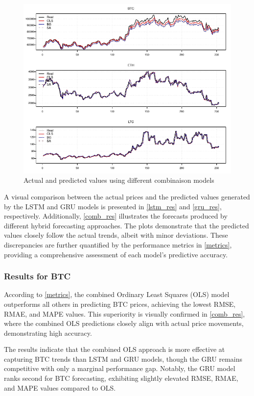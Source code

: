 \documentclass{dsfe}
\begin{document}
\begin{figure}[t]
\centering
\includegraphics[scale=1.25]{comb_all.pdf}
\caption{Actual and predicted values using different combinaison  models}\label{comb_res}
\end{figure}

A visual comparison between the actual prices and the predicted values generated by the LSTM and GRU models is presented in \autoref{lstm_res} and \autoref{gru_res}, respectively. Additionally, \autoref{comb_res} illustrates the forecasts produced by different hybrid forecasting approaches. The plots demonstrate that the predicted values closely follow the actual trends, albeit with minor deviations. These discrepancies are further quantified by the performance metrics in \autoref{metrics}, providing a comprehensive assessment of each model's predictive accuracy.
\subsubsection{Results for BTC}
According to \autoref{metrics}, the combined Ordinary Least Squares (OLS) model outperforms all others in predicting BTC prices, achieving the lowest RMSE, RMAE, and MAPE values. This superiority is visually confirmed in \autoref{comb_res}, where the combined OLS predictions closely align with actual price movements, demonstrating high accuracy.

The results indicate that the combined OLS approach is more effective at capturing BTC trends than LSTM and GRU models, though the GRU remains competitive with only a marginal performance gap. Notably, the GRU model ranks second for BTC forecasting, exhibiting slightly elevated RMSE, RMAE, and MAPE values compared to OLS.
\end{document}
